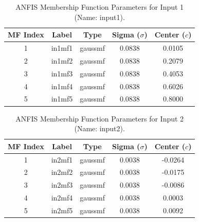 \documentclass[12pt]{article}
\begin{document}
\begin{table}[H]
\centering
\begin{tabular}{|c|c|c|c|c|}
\hline
\textbf{MF Index} & \textbf{Label} & \textbf{Type} & \textbf{Sigma ($\sigma$)} & \textbf{Center ($c$)} \\ \hline
1 & in1mf1 & gaussmf & 0.0838 & 0.0105 \\ \hline
2 & in1mf2 & gaussmf & 0.0838 & 0.2079 \\ \hline
3 & in1mf3 & gaussmf & 0.0838 & 0.4053 \\ \hline
4 & in1mf4 & gaussmf & 0.0838 & 0.6026 \\ \hline
5 & in1mf5 & gaussmf & 0.0838 & 0.8000 \\ \hline
\end{tabular}
\caption{ANFIS Membership Function Parameters for Input 1 (Name: input1).}
\label{tab:input1_params}
\end{table}

\begin{table}[H]
\centering
\begin{tabular}{|c|c|c|c|c|}
\hline
\textbf{MF Index} & \textbf{Label} & \textbf{Type} & \textbf{Sigma ($\sigma$)} & \textbf{Center ($c$)} \\ \hline
1 & in2mf1 & gaussmf & 0.0038 & -0.0264 \\ \hline
2 & in2mf2 & gaussmf & 0.0038 & -0.0175 \\ \hline
3 & in2mf3 & gaussmf & 0.0038 & -0.0086 \\ \hline
4 & in2mf4 & gaussmf & 0.0038 & 0.0003 \\ \hline
5 & in2mf5 & gaussmf & 0.0038 & 0.0092 \\ \hline
\end{tabular}
\caption{ANFIS Membership Function Parameters for Input 2 (Name: input2).}
\label{tab:input2_params}
\end{table}
\end{document}
